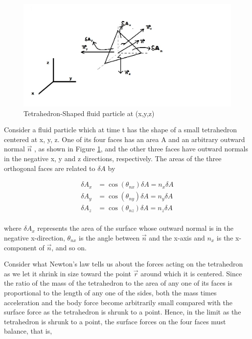\documentclass{article}
\begin{document}
{\begin{figure}[h!]
\centering
\includegraphics[scale=.6]{Tetrahedron shaped fluid particle.jpg}
\caption{Tetrahedron-Shaped fluid particle at (x,y,z)}
\label{fig:tet_shpd_partcl}
\end{figure}

Consider a fluid particle which at time t has the shape of a small tetrahedron centered at x, y, z. One of its four faces has an area A and an arbitrary outward normal $\overrightarrow{n}$ , as shown in Figure \ref{fig:tet_shpd_partcl}, and the other three faces have outward normals in the negative x, y and z directions, respectively. The areas of the three orthogonal faces are related to $\delta A$ by

\begin{equation}
\begin{split}
\delta A_{x} &= \cos(\theta_{nx})\delta A = n_{x} \delta A\\
\delta A_{y} &= \cos(\theta_{ny})\delta A = n_{y} \delta A\\
\delta A_{z} &= \cos(\theta_{nz})\delta A = n_{z} \delta A\\  \label{e7}
\end{split}
\end{equation}

where $\delta A_x$ represents the area of the surface whose outward normal is in the negative x-direction, $\theta_{nx}$ is the angle between $\overrightarrow{n}$ and the x-axis and $n_x$ is the x-component of $\overrightarrow{n}$, and so on.

Consider what Newton's law tells us about the forces acting on the tetrahedron as we let it shrink in size toward the point $\overrightarrow{r}$ around which it is centered. Since the ratio of the mass of the tetrahedron to the area of any one of its faces is proportional to the length of any one of the sides, both the mass times acceleration and the body force become arbitrarily small compared with the surface force as the tetrahedron is shrunk to a point. Hence, in the limit as the tetrahedron is shrunk to a point, the surface forces on the four faces must balance, that is,

}
\end{document}
